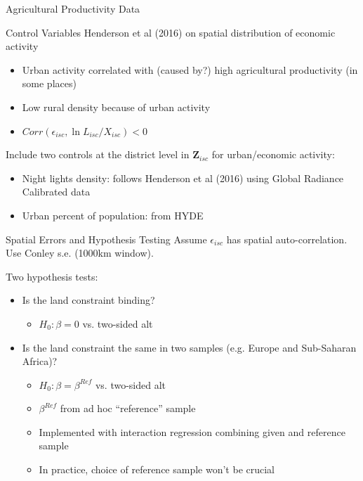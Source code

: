 \documentclass[10pt, xcolor=dvipsnames]{beamer}
\begin{document}
\begin{frame}{Agricultural Productivity Data}

\end{frame}

\begin{frame}{Control Variables}
Henderson et al (2016) on spatial distribution of economic activity
\begin{itemize}
  \item Urban activity correlated with (caused by?) high agricultural productivity (in some places)
  \item Low rural density because of urban activity
  \item $Corr(\epsilon_{isc},\ln L_{isc}/X_{isc})<0$
\end{itemize}

Include two controls at the district level in $\mathbf{Z}_{isc}$ for urban/economic activity:
\begin{itemize}
  \item Night lights density: follows Henderson et al (2016) using Global Radiance Calibrated data
  \item Urban percent of population: from HYDE
\end{itemize}

\end{frame}

\begin{frame}{Spatial Errors and Hypothesis Testing}\label{testing}
Assume $\epsilon_{isc}$ has spatial auto-correlation. Use Conley s.e. (1000km window). 

\vspace{.2cm} Two hypothesis tests:
\begin{itemize}
  \item Is the land constraint binding? 
    \begin{itemize}
      \item $H_0: \beta=0$ vs. two-sided alt 
    \end{itemize}
  \item Is the land constraint the same in two samples (e.g. Europe and Sub-Saharan Africa)? 
    \begin{itemize}
      \item $H_0: \beta = \beta^{Ref}$ vs. two-sided alt 
      \item $\beta^{Ref}$ from ad hoc ``reference'' sample
      \item Implemented with interaction regression combining given and reference sample
      \item In practice, choice of reference sample won't be crucial
    \end{itemize}
\end{itemize}
\hfill \hyperlink{interaction}{}
\end{frame}
\end{document}
